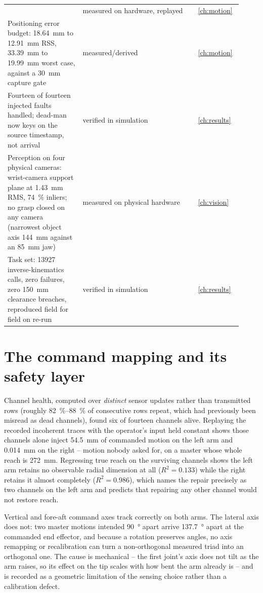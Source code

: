 \begin{table}[htbp]
\begin{tabular}{@{}p{0.30\linewidth}p{0.46\linewidth}p{0.16\linewidth}@{}}
      & measured on hardware, replayed & \cref{ch:motion} \\
    Positioning error budget: \SI{18.64}{\milli\metre} to
      \SI{12.91}{\milli\metre} RSS, \SI{33.39}{\milli\metre} to
      \SI{19.99}{\milli\metre} worst case, against a \SI{30}{\milli\metre}
      capture gate & measured/derived & \cref{ch:motion} \\
    Fourteen of fourteen injected faults handled; dead-man now keys on the
      source timestamp, not arrival & verified in simulation &
      \cref{ch:results} \\
    Perception on four physical cameras: wrist-camera support plane at
      \SI{1.43}{\milli\metre} RMS, \SI{74}{\percent} inliers; no grasp closed
      on any camera (narrowest object axis \SI{144}{\milli\metre} against an
      \SI{85}{\milli\metre} jaw) & measured on physical hardware &
      \cref{ch:vision} \\
    Task set: \num{13927} inverse-kinematics calls, zero failures, zero
      \SI{150}{\milli\metre} clearance breaches, reproduced field for field on
      re-run & verified in simulation & \cref{ch:results} \\
    \bottomrule
  \end{tabular}
\end{table}

\section{The command mapping and its safety layer}

Channel health, computed over \emph{distinct} sensor updates rather than
transmitted rows (roughly \SIrange{82}{88}{\percent} of consecutive rows
repeat, which had previously been misread as dead channels), found six of
fourteen channels alive. Replaying the recorded incoherent traces with the
operator's input held constant shows those channels alone inject
\SI{54.5}{\milli\metre} of commanded motion on the left arm and
\SI{0.014}{\milli\metre} on the right -- motion nobody asked for, on a master
whose whole reach is \SI{272}{\milli\metre}. Regressing true reach on the
surviving channels shows the left arm retains no observable radial dimension
at all ($R^2=\num{0.133}$) while the right retains it almost completely
($R^2=\num{0.986}$), which names the repair precisely as two channels on the
left arm and predicts that repairing any other channel would not restore
reach.

Vertical and fore-aft command axes track correctly on both arms. The lateral
axis does not: two master motions intended \SI{90}{\degree}
apart arrive \SI{137.7}{\degree} apart at the commanded end effector, and
because a rotation preserves angles, no axis remapping or recalibration can
turn a non-orthogonal measured triad into an orthogonal one. The cause is
mechanical -- the first joint's axis does not tilt as the arm raises, so its
effect on the tip scales with how bent the arm already is -- and is recorded
as a geometric limitation of the sensing choice rather than a calibration
defect.

